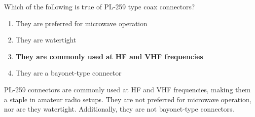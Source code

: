 \begin{tcolorbox}[colback=gray!10!white,colframe=black!75!black,title={T9B07}]
    Which of the following is true of PL-259 type coax connectors?
    \begin{enumerate}[label=\Alph*),noitemsep]
        \item They are preferred for microwave operation
        \item They are watertight
        \item \textbf{They are commonly used at HF and VHF frequencies}
        \item They are a bayonet-type connector
    \end{enumerate}
\end{tcolorbox}

PL-259 connectors are commonly used at HF and VHF frequencies, making them a staple in amateur radio setups. They are not preferred for microwave operation, nor are they watertight. Additionally, they are not bayonet-type connectors.
